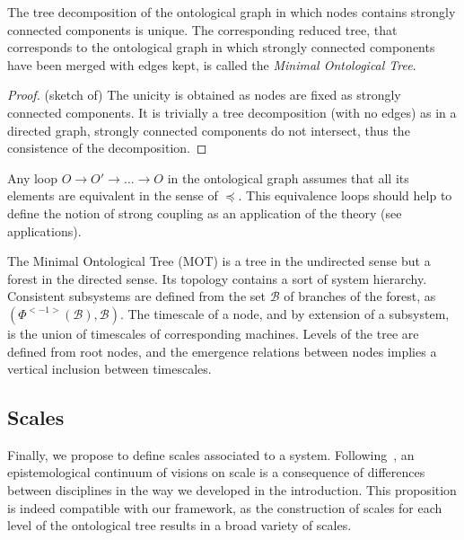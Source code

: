 \begin{proposition}
The tree decomposition of the ontological graph in which nodes contains strongly connected components is unique. The corresponding reduced tree, that corresponds to the ontological graph in which strongly connected components have been merged with edges kept, is called the \emph{Minimal Ontological Tree}.
\end{proposition}

\begin{proof}
(sketch of) The unicity is obtained as nodes are fixed as strongly connected components. It is trivially a tree decomposition (with no edges) as in a directed graph, strongly connected components do not intersect, thus the consistence of the decomposition.
\end{proof}

Any loop $O \rightarrow O' \rightarrow \ldots \rightarrow O$ in the ontological graph assumes that all its elements are equivalent in the sense of $\preccurlyeq$. This equivalence loops should help to define the notion of strong coupling as an application of the theory (see applications).

\medskip

The Minimal Ontological Tree (MOT) is a tree in the undirected sense but a forest in the directed sense. Its topology contains a sort of system hierarchy. Consistent subsystems are defined from the set $\mathcal{B}$ of branches of the forest, as $(\Phi^{<-1>}(\mathcal{B}),\mathcal{B})$. The timescale of a node, and by extension of a subsystem, is the union of timescales of corresponding machines. Levels of the tree are defined from root nodes, and the emergence relations between nodes implies a vertical inclusion between timescales.






\subsection*{Scales}

Finally, we propose to define scales associated to a system. Following~\cite{manson2008does}, an epistemological continuum of visions on scale is a consequence of differences between disciplines in the way we developed in the introduction. This proposition is indeed compatible with our framework, as the construction of scales for each level of the ontological tree results in a broad variety of scales.


